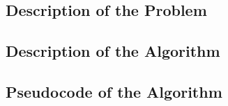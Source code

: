 \subsection{Description of the Problem}
\label{sect:algorithm:problem}


\subsection{Description of the Algorithm}
\label{sect:algorithm:algorithm}


\subsection{Pseudocode of the Algorithm}
\label{sect:algorithm:pseudocode}
